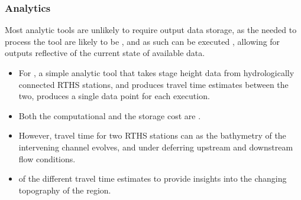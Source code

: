 \documentclass[letterpaper,12pt,english]{book}
\begin{document}
\subsubsection{Analytics}
\label{\detokenize{requirements/information/analytics:analytics}}\label{\detokenize{requirements/information/analytics::doc}}
\sphinxAtStartPar
Most analytic tools are unlikely to require output data storage, as the  needed to process the tool are likely to be , and as such can be executed , allowing for outputs reflective of the current state of available data.
\begin{itemize}
\item {} 
\sphinxAtStartPar
For , a simple analytic tool that takes stage height data from hydrologically connected RTHS stations, and produces travel time estimates between the two, produces a single data point for each execution.

\item {} 
\sphinxAtStartPar
Both the computational  and the storage cost are .

\item {} 
\sphinxAtStartPar
However, travel time  for two RTHS stations can  as the bathymetry of the intervening channel evolves, and under deferring upstream and downstream flow conditions.

\item {} 
\sphinxAtStartPar
{} of the different travel time estimates  to provide insights into the changing topography of the region.

\end{itemize}
\end{document}
